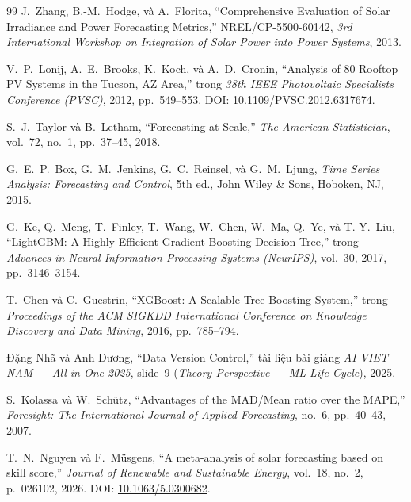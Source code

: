 \documentclass[12pt, a4paper]{report}
\begin{document}
\begin{thebibliography}{99}
J.~Zhang, B.-M.~Hodge, và A.~Florita,
\newblock ``Comprehensive Evaluation of Solar Irradiance and Power Forecasting Metrics,''
\newblock NREL/CP-5500-60142, \textit{3rd International Workshop on Integration of Solar Power into Power Systems}, 2013.

V.~P.~Lonij, A.~E.~Brooks, K.~Koch, và A.~D.~Cronin,
\newblock ``Analysis of 80 Rooftop PV Systems in the Tucson, AZ Area,''
\newblock trong \textit{38th IEEE Photovoltaic Specialists Conference (PVSC)}, 2012, pp.~549--553.
\newblock DOI: \href{https://doi.org/10.1109/PVSC.2012.6317674}{10.1109/PVSC.2012.6317674}.

S.~J.~Taylor và B.~Letham,
\newblock ``Forecasting at Scale,''
\newblock \textit{The American Statistician}, vol.~72, no.~1, pp.~37--45, 2018.

G.~E.~P.~Box, G.~M.~Jenkins, G.~C.~Reinsel, và G.~M.~Ljung,
\newblock \textit{Time Series Analysis: Forecasting and Control}, 5th ed.,
\newblock John Wiley \& Sons, Hoboken, NJ, 2015.

G.~Ke, Q.~Meng, T.~Finley, T.~Wang, W.~Chen, W.~Ma, Q.~Ye, và T.-Y.~Liu,
\newblock ``LightGBM: A Highly Efficient Gradient Boosting Decision Tree,''
\newblock trong \textit{Advances in Neural Information Processing Systems (NeurIPS)}, vol.~30, 2017, pp.~3146--3154.

T.~Chen và C.~Guestrin,
\newblock ``XGBoost: A Scalable Tree Boosting System,''
\newblock trong \textit{Proceedings of the ACM SIGKDD International Conference on Knowledge Discovery and Data Mining}, 2016, pp.~785--794.

Đặng Nhã và Anh Dương,
\newblock ``Data Version Control,''
\newblock tài liệu bài giảng \textit{AI VIET NAM --- All-in-One 2025}, slide~9 (\textit{Theory Perspective --- ML Life Cycle}), 2025.

S.~Kolassa và W.~Schütz,
\newblock ``Advantages of the MAD/Mean ratio over the MAPE,''
\newblock \textit{Foresight: The International Journal of Applied Forecasting}, no.~6, pp.~40--43, 2007.

T.~N.~Nguyen và F.~Müsgens,
\newblock ``A meta-analysis of solar forecasting based on skill score,''
\newblock \textit{Journal of Renewable and Sustainable Energy}, vol.~18, no.~2, p.~026102, 2026.
\newblock DOI: \href{https://doi.org/10.1063/5.0300682}{10.1063/5.0300682}.


\end{thebibliography}
\end{document}
